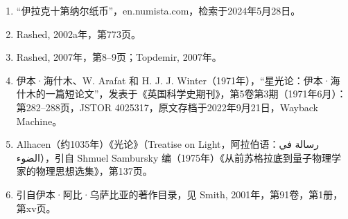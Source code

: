 \begin{enumerate}
\item “伊拉克十第纳尔纸币”，en.numista.com，检索于2024年5月28日。
\item Rashed, 2002a年，第773页。
\item Rashed, 2007年，第8–9页；Topdemir, 2007年。
\item 伊本·海什木、W. Arafat 和 H. J. J. Winter（1971年），“星光论：伊本·海什木的一篇短论文”，发表于《英国科学史期刊》，第5卷第3期（1971年6月）：第282–288页，JSTOR 4025317，原文存档于2022年9月21日，Wayback Machine。
\item Alhacen（约1035年）《光论》（Treatise on Light，阿拉伯语：رسالة في الضوء），引自 Shmuel Sambursky 编（1975年）《从前苏格拉底到量子物理学家的物理思想选集》，第137页。
\item 引自伊本·阿比·乌萨比亚的著作目录，见 Smith, 2001年，第91卷，第1册，第xv页。
\end{enumerate}

